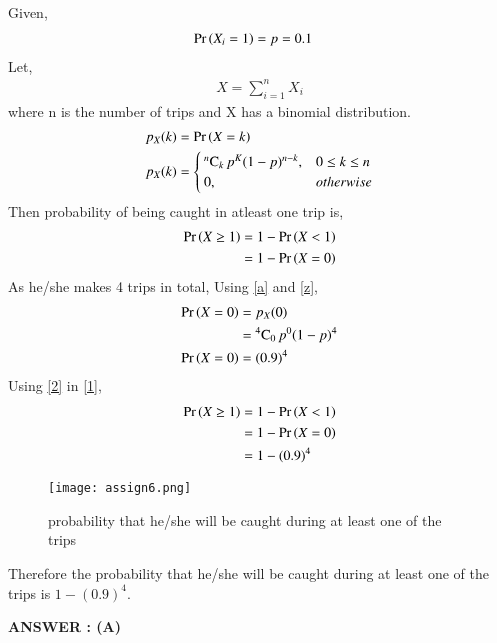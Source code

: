 \documentclass[journal,12pt,twocolumn]{IEEEtran}
\begin{document}
Given,
\begin{align}
     \Pr\left(X_i=1\right)&=p=0.1 \label{a}
\end{align}
Let,
\begin{align}
    X=\sum_{i=1}^n X_i
\end{align}
where n is the number of trips and X has a binomial distribution.
\begin{align}
p_X(k)&=\Pr\left(X=k\right)\\
    p_X(k)&=
    \begin{cases}
     {}^{n}\mathrm{C}_{k}\,p^K(1-p)^{n-k}, & 0\le k\le n
     \\
    0, & otherwise
    \end{cases}\label{z}
\end{align}
Then probability of being caught in atleast one trip is,
\begin{align}
    \Pr\left(X\ge1\right)&=1-\Pr\left(X<1\right)\\
    &=1-\Pr\left(X=0\right)\label{1}
\end{align}
As he/she makes 4 trips in total, Using \eqref{a} and
\eqref{z},
\begin{align}
    \Pr\left(X=0\right)&=p_X(0)\\
    &={}^{4}\mathrm{C}_{0}\,p^0(1-p)^4\\
    \Pr\left(X=0\right)&=(0.9)^4\label{2}
\end{align}
Using \eqref{2} in \eqref{1},
\begin{align}
    \Pr\left(X\ge1\right)&=1-\Pr\left(X<1\right)\\
    &=1-\Pr\left(X=0\right)\\
    &=1-(0.9)^4
\end{align}
\begin{figure}[t]
    \centering
    \texttt{[image: assign6.png]}
    \caption{probability that he/she will be caught during at least one of the trips}
\end{figure}
Therefore the probability that he/she will be caught during at least one of the trips is $1-(0.9)^4$.

\textbf{ANSWER : (A)}
\end{document}
